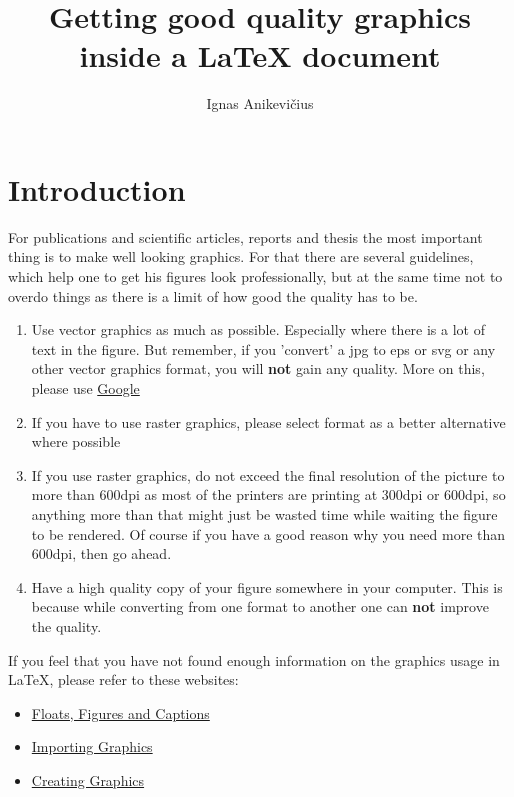 \documentclass[
]{scrartcl}
\title{Getting good quality graphics inside a \LaTeX{} document}
\author{Ignas Anikevičius}
\begin{document}

\maketitle
\tableofcontents
\listoftodos{\vskip 1em}
\clearpage

\section{Introduction}

%
For publications and scientific articles, reports and thesis the most important
    thing is to make well looking graphics. 
%
For that there are several guidelines, which help one to get his figures look
    professionally, but at the same time not to overdo things as there is a
    limit of how good the quality has to be.

\begin{enumerate}
    \item Use vector graphics as much as possible. Especially where there is a
        lot of text in the figure. But remember, if you 'convert' a jpg to eps
        or svg or any other vector graphics format, you will \textbf{not} gain
        any quality. More on this, please use
        \href{http://www.google.co.uk}{Google}
    \item If you have to use raster graphics, please select  format as
        a better alternative where possible
    \item If you use raster graphics, do not exceed the final resolution of the
        picture to more than 600dpi as most of the printers are printing at
        300dpi or 600dpi, so anything more than that might just be wasted time
        while waiting the figure to be rendered. Of course if you have a good
        reason why you need more than 600dpi, then go ahead.
    \item Have a high quality copy of your figure somewhere in your computer.
        This is because while converting from one format to another one can
        \textbf{not} improve the quality.
\end{enumerate}

If you feel that you have not found enough information on the graphics usage in
\LaTeX, please refer to these websites:
\begin{itemize}
    \item
        \href{https://secure.wikimedia.org/wikibooks/en/wiki/LaTeX/Floats,_Figures_and_Captions}{Floats,
        Figures and Captions}
    \item
        \href{https://secure.wikimedia.org/wikibooks/en/wiki/LaTeX/Importing_Graphics}{Importing
        Graphics}
    \item
        \href{https://secure.wikimedia.org/wikibooks/en/wiki/LaTeX/Creating_Graphics}{Creating
        Graphics}
\end{itemize}
\end{document}
